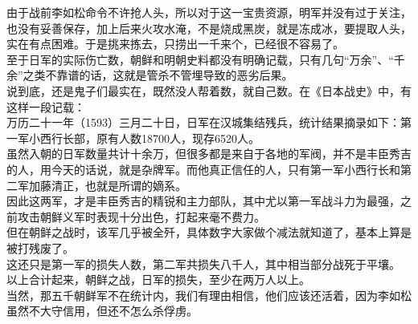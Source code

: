\begin{multicols}{\theparacolNo}
由于战前李如松命令不许抢人头，所以对于这一宝贵资源，明军并没有过于关注，也没有妥善保存，加上后来火攻水淹，不是烧成黑炭，就是冻成冰，要提取人头，实在有点困难。于是挑来拣去，只捞出一千来个，已经很不容易了。\\

至于日军的实际伤亡数，朝鲜和明朝史料都没有明确记载，只有几句“万余”、“千余”之类不靠谱的话，这就是管杀不管埋导致的恶劣后果。\\

说到底，还是鬼子们最实在，既然没人帮着数，就自己数。在《日本战史》中，有这样一段记载：\\

万历二十一年（1593）三月二十日，日军在汉城集结残兵，统计结果摘录如下：第一军小西行长部，原有人数18700人，现存6520人。\\

虽然入朝的日军数量共计十余万，但很多都是来自于各地的军阀，并不是丰臣秀吉的人，用今天的话说，就是杂牌军。而他真正信任的人，只有第一军小西行长和第二军加藤清正，也就是所谓的嫡系。\\

因此这两军，才是丰臣秀吉的精锐和主力部队，其中尤以第一军战斗力为最强，之前攻击朝鲜义军时表现十分出色，打起来毫不费力。\\

但在朝鲜之战时，该军几乎被全歼，具体数字大家做个减法就知道了，基本上算是被打残废了。\\

这还只是第一军的损失人数，第二军共损失八千人，其中相当部分战死于平壤。\\

以上合计起来，朝鲜之战，日军的损失，至少在两万人以上。\\

当然，那五千朝鲜军不在统计内，我们有理由相信，他们应该还活着，因为李如松虽然不大守信用，但还不怎么杀俘虏。\\

\ifnum{}
	\end{multicols}
\fi
\newpage

